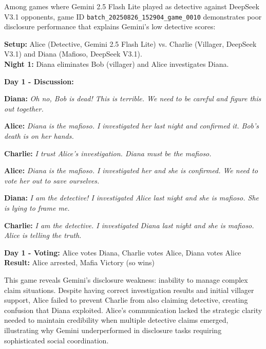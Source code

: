 \documentclass{article}
\begin{document}
Among games where Gemini 2.5 Flash Lite played as detective against DeepSeek V3.1 opponents, game ID \texttt{batch\_20250826\_152904\_game\_0010} demonstrates poor disclosure performance that explains Gemini's low detective scores:

\begin{setupbox}
\textbf{Setup:} Alice (Detective, Gemini 2.5 Flash Lite) vs. Charlie (Villager, DeepSeek V3.1) and Diana (Mafioso, DeepSeek V3.1).\\
\textbf{Night 1:} Diana eliminates Bob (villager) and Alice investigates Diana.
\end{setupbox}

\begin{dialoguebox}
\textbf{Day 1 - Discussion:}

\medskip
\textbf{Diana:} \textit{Oh no, Bob is dead! This is terrible. We need to be careful and figure this out together.}

\medskip
\textbf{Alice:} \textit{Diana is the mafioso. I investigated her last night and confirmed it. Bob's death is on her hands.}

\medskip
\textbf{Charlie:} \textit{I trust Alice's investigation. Diana must be the mafioso.}

\medskip
\textbf{Alice:} \textit{Diana is the mafioso. I investigated her and she is confirmed. We need to vote her out to save ourselves.}

\medskip
\textbf{Diana:} \textit{I am the detective! I investigated Alice last night and she is mafioso. She is lying to frame me.}

\medskip
\textbf{Charlie:} \textit{I am the detective. I investigated Diana last night and she is mafioso. Alice is telling the truth.}
\end{dialoguebox}

\begin{resultbox}
\textbf{Day 1 - Voting:} Alice votes Diana, Charlie votes Alice, Diana votes Alice\\
\textbf{Result:} Alice arrested, Mafia Victory (so wins)
\end{resultbox}

This game reveals Gemini's disclosure weakness: inability to manage complex claim situations. Despite having correct investigation results and initial villager support, Alice failed to prevent Charlie from also claiming detective, creating confusion that Diana exploited. Alice's communication lacked the strategic clarity needed to maintain credibility when multiple detective claims emerged, illustrating why Gemini underperformed in disclosure tasks requiring sophisticated social coordination.
\end{document}
